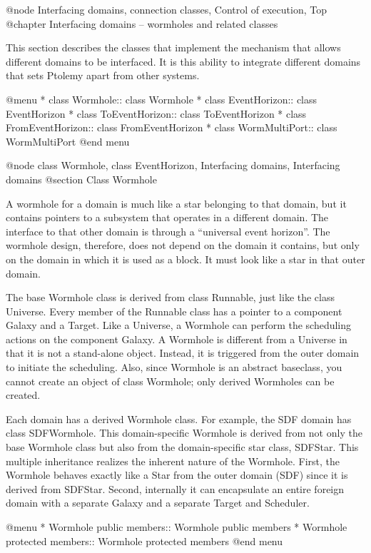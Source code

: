 @node Interfacing domains, connection classes, Control of execution, Top
@chapter Interfacing domains -- wormholes and related classes

This section describes the classes that implement the mechanism that
allows different domains to be interfaced.  It is this ability to
integrate different domains that sets Ptolemy apart from other systems.

@menu
* class Wormhole::              class Wormhole
* class EventHorizon::          class EventHorizon
* class ToEventHorizon::        class ToEventHorizon
* class FromEventHorizon::      class FromEventHorizon
* class WormMultiPort::         class WormMultiPort
@end menu

@node class Wormhole, class EventHorizon, Interfacing domains, Interfacing domains
@section Class Wormhole

A wormhole for a domain is much like a star belonging to that domain,
but it contains pointers to a subsystem that operates in a different
domain.  The interface to that other domain is through a ``universal
event horizon''.  The wormhole design, therefore, does not depend on the
domain it contains, but only on the domain in which it is used as a
block.  It must look like a star in that outer domain.

The base Wormhole class is derived from class Runnable, just like the
class Universe.  Every member of the Runnable class has a pointer to a
component Galaxy and a Target.  Like a Universe, a Wormhole can perform
the scheduling actions on the component Galaxy. A Wormhole is different
from a Universe in that it is not a stand-alone object.  Instead, it is
triggered from the outer domain to initiate the scheduling.  Also, since
Wormhole is an abstract baseclass, you cannot create an object of class
Wormhole; only derived Wormholes can be created.

Each domain has a derived Wormhole class.  For example, the SDF domain
has class SDFWormhole.  This domain-specific Wormhole is derived from
not only the base Wormhole class but also from the domain-specific star
class, SDFStar.  This multiple inheritance realizes the inherent nature
of the Wormhole.  First, the Wormhole behaves exactly like a Star from
the outer domain (SDF) since it is derived from SDFStar.  Second,
internally it can encapsulate an entire foreign domain with a separate
Galaxy and a separate Target and Scheduler.

@menu
* Wormhole public members::     Wormhole public members
* Wormhole protected members::  Wormhole protected members
@end menu

